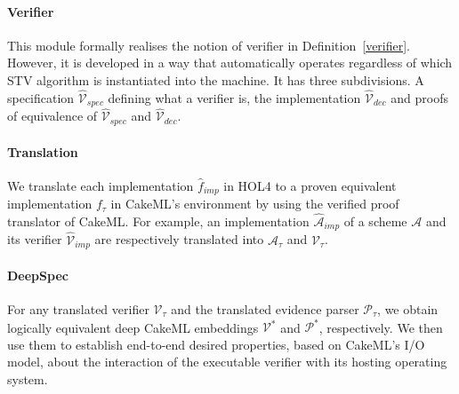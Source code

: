 \documentclass[10pt,conference]{IEEEtran}
\begin{document}
\paragraph*{\textbf{Verifier}} This module formally realises  the notion of verifier in Definition~\ref{verifier}. However, it is developed in a way that automatically operates  regardless of which STV algorithm is instantiated into the machine. It has three subdivisions. A  specification $\hat{\mathcal{V}}_{spec}$ defining what a verifier is, the implementation $\hat{\mathcal{V}}_{dec}$ and proofs of equivalence of $\hat{\mathcal{V}}_{spec}$ and $\hat{\mathcal{V}}_{dec}$.
\paragraph*{\textbf{Translation}} We translate each implementation $\hat{f}_{imp}$ in HOL4 to a proven  equivalent implementation $f_{\tau}$ in CakeML's environment by using the verified proof translator of CakeML. For example, an implementation  $\hat{\mathcal{A}}_{imp}$ of a scheme $\mathcal{A}$ and its   verifier $\hat{\mathcal{V}}_{imp}$ are  respectively translated into $\mathcal{A}_{\tau}$  and $\mathcal{V}_{\tau}$. 
\paragraph*{\textbf{DeepSpec}} 
For any translated verifier $\mathcal{V}_{\tau}$ and the translated evidence parser $\mathcal{P}_{\tau}$, we obtain logically equivalent deep CakeML embeddings  $\mathcal{V}^{*}$ and $\mathcal{P}^{*}$, respectively. We then use them to establish end-to-end desired properties, based on CakeML's I/O model, about the interaction of the executable verifier with its hosting operating system. 
\end{document}
